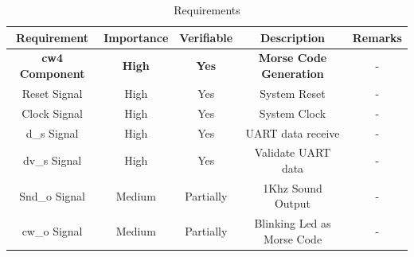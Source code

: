 \documentclass[12pt,a4paper, landscape]{article}
\begin{document}
\begin{table}[h!]
\centering
\begin{tabular}{|c||c|c|c|c|} 
 \hline
 \textbf{Requirement} & \textbf{Importance}& \textbf{Verifiable} & \textbf{Description} & \textbf{Remarks} \\ [0.5ex] 
 \hline
 \textbf{cw4 Component} & \textbf{High} & \textbf{Yes} & \textbf{Morse Code Generation} & - \\[0.5ex] 
 \hline 
  Reset Signal & High & Yes & System Reset & -\\ [0.5ex] 
 \hline
 Clock Signal & High & Yes & System Clock & - \\ [0.5ex]  
 \hline
 d\_s Signal & High & Yes & UART data receive & - \\ [0.5ex] 
 \hline
 dv\_s Signal & High & Yes & Validate UART data & - \\ [0.5ex] 
 \hline
 Snd\_o Signal & Medium & Partially & 1Khz Sound Output  & - \\ [0.5ex] 
 \hline
  cw\_o Signal & Medium & Partially & Blinking Led as Morse Code & - \\ [0.5ex] 
 \hline
  
\end{tabular}
\caption{ Requirements }
\label{table:1}
\end{table}
\end{document}
